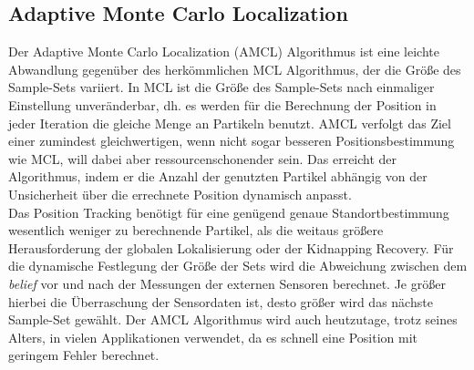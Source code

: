 \subsection{Adaptive Monte Carlo Localization}\label{subsec:amcl}
Der Adaptive Monte Carlo Localization (AMCL) Algorithmus ist eine leichte Abwandlung gegenüber des herkömmlichen MCL Algorithmus, der die Größe des Sample-Sets variiert. In MCL ist die Größe des Sample-Sets nach einmaliger Einstellung unveränderbar, dh. es werden für die Berechnung der Position in jeder Iteration die gleiche Menge an Partikeln benutzt. AMCL verfolgt das Ziel einer zumindest gleichwertigen, wenn nicht sogar besseren Positionsbestimmung wie MCL, will dabei aber ressourcenschonender sein. Das erreicht der Algorithmus, indem er die Anzahl der genutzten Partikel abhängig von der Unsicherheit über die errechnete Position dynamisch anpasst.\\
Das Position Tracking benötigt für eine genügend genaue Standortbestimmung wesentlich weniger zu berechnende Partikel, als die weitaus größere Herausforderung der globalen Lokalisierung oder der Kidnapping Recovery. Für die dynamische Festlegung der Größe der Sets wird die Abweichung zwischen dem \textit{belief} vor und nach der Messungen der externen Sensoren berechnet. Je größer hierbei die Überraschung der Sensordaten ist, desto größer wird das nächste Sample-Set gewählt. Der AMCL Algorithmus wird auch heutzutage, trotz seines Alters, in vielen Applikationen verwendet, da es schnell eine Position mit geringem Fehler berechnet.



